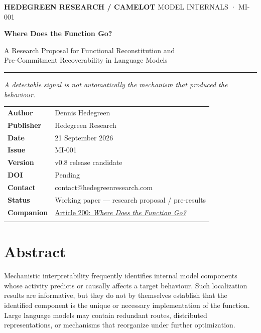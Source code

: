 \documentclass[11pt,a4paper]{article}
\newcommand{\metarow}[2]{\textsf{\footnotesize\textbf{#1}} & \footnotesize #2 \\\addlinespace[1.5pt]}
\begin{document}
\begin{titlepage}
\color{hrink}
\vspace*{5mm}
{\sffamily\small\bfseries\color{hrgreen!55!black}\MakeUppercase{Hedegreen Research / Camelot}}\hfill{\sffamily\small\color{hrmuted} MODEL INTERNALS · MI-001}
\vspace{24mm}

{\sffamily\fontsize{31}{34}\selectfont\bfseries\color{hrink} Where Does the Function Go?\par}
\vspace{5mm}
{\fontsize{15}{19}\selectfont\color{hrink} A Research Proposal for Functional Reconstitution and\\Pre-Commitment Recoverability in Language Models\par}
\vspace{8mm}
{\color{hrgreen}\rule{\textwidth}{1.2pt}}
\vspace{11mm}

{\large\itshape\color{hrink} A detectable signal is not automatically the mechanism that produced the behaviour.\par}
\vfill
\centering

\vfill
\raggedright
\begin{tabular}{@{}p{31mm}p{110mm}@{}}
\metarow{Author}{Dennis Hedegreen}
\metarow{Publisher}{Hedegreen Research}
\metarow{Date}{21 September 2026}
\metarow{Issue}{MI-001}
\metarow{Version}{v0.8 release candidate}
\metarow{DOI}{Pending}
\metarow{Contact}{contact@hedegreenresearch.com}
\metarow{Status}{Working paper — research proposal / pre-results}
\metarow{Companion}{\href{https://hedegreenresearch.com/articles/where-does-the-function-go/}{Article 200: \emph{Where Does the Function Go?}}}
\end{tabular}
\end{titlepage}
\color{hrink}
\setcounter{page}{1}

\section*{Abstract}
Mechanistic interpretability frequently identifies internal model components whose activity predicts or causally affects a target behaviour. Such localization results are informative, but they do not by themselves establish that the identified component is the unique or necessary implementation of the function. Large language models may contain redundant routes, distributed representations, or mechanisms that reorganize under further optimization.
\end{document}
